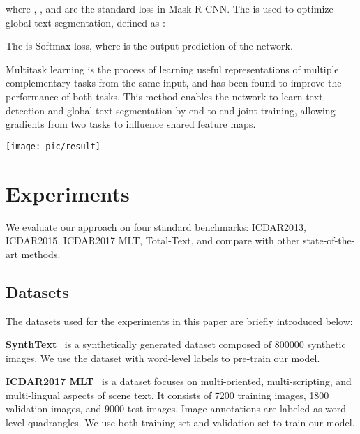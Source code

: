 \documentclass[letterpaper]{article} \usepackage{aaai19}  \usepackage{times}  \usepackage{helvet}  \usepackage{courier}  \usepackage{url}  \usepackage{graphicx}
\begin{document}
where  ,  ,   and  are the standard loss in Mask R-CNN. 
The   is used to optimize global text segmentation, defined as :

The  is Softmax loss, where  is the output prediction of the network.

\iffalse
Multi-task learning is the process of learning a representation that is useful for multiple complementary tasks from the same input and has been found to improve the performance of both tasks. This method can make network learn both text box detection and global text segmentation in an end-to-end manner, allowing gradients from both tasks to influence a shared feature map.
\fi
Multitask learning is the process of learning useful representations of multiple complementary tasks from the same input, and has been found to improve the performance of both tasks.
This method enables the network to learn text detection and global text segmentation by end-to-end joint training, allowing gradients from two tasks to influence shared feature maps.





\begin{figure*}[ht!]
\centering
\texttt{[image: pic/result]}
\caption{\label{result}{Qualitative results of the proposed algorithm. (a) ICDAR2013. (b) ICDAR2015. (c)ICDAR2017. (d) Total-Text.
}}
\end{figure*}



\section{Experiments}
We evaluate our approach on four standard benchmarks: ICDAR2013, ICDAR2015, ICDAR2017 MLT, Total-Text, and compare with other state-of-the-art methods.
\subsection{Datasets}
The datasets used for the experiments in this paper are briefly introduced below:

\textbf{SynthText}~\cite{gupta2016synthetic} is a synthetically generated dataset composed of 800000 synthetic images. We use the dataset with word-level labels to pre-train our model.


\textbf{ICDAR2017 MLT}~\cite{nayef2017icdar2017} is a dataset focuses on multi-oriented, multi-scripting, and multi-lingual aspects of scene text. It consists of 7200 training images, 1800 validation images, and 9000 test images. Image annotations are labeled as word-level quadrangles. We use both training set and validation set to train our model.
\end{document}
